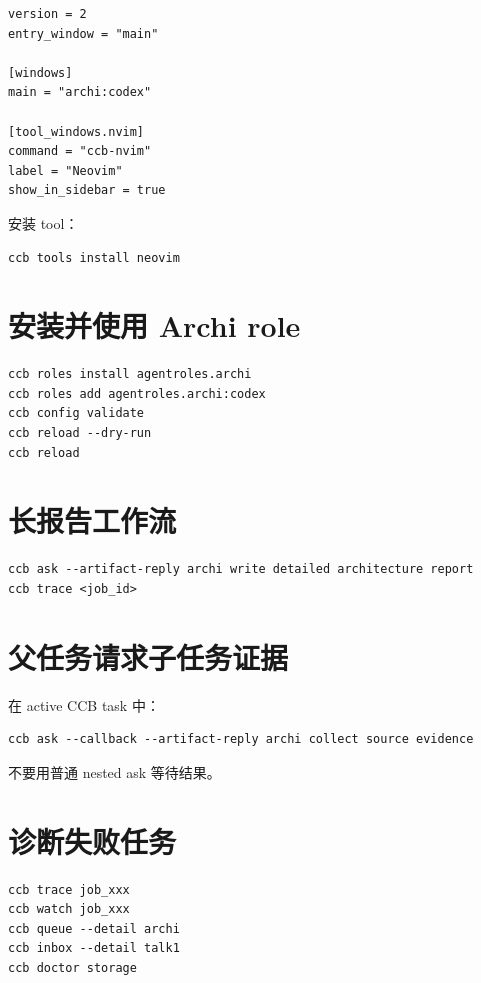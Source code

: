 \begin{lstlisting}
version = 2
entry_window = "main"

[windows]
main = "archi:codex"

[tool_windows.nvim]
command = "ccb-nvim"
label = "Neovim"
show_in_sidebar = true
\end{lstlisting}

安装 tool：

\begin{lstlisting}
ccb tools install neovim
\end{lstlisting}

\section{安装并使用 Archi role}

\begin{lstlisting}
ccb roles install agentroles.archi
ccb roles add agentroles.archi:codex
ccb config validate
ccb reload --dry-run
ccb reload
\end{lstlisting}

\section{长报告工作流}

\begin{lstlisting}
ccb ask --artifact-reply archi write detailed architecture report
ccb trace <job_id>
\end{lstlisting}

\section{父任务请求子任务证据}

在 active CCB task 中：

\begin{lstlisting}
ccb ask --callback --artifact-reply archi collect source evidence
\end{lstlisting}

不要用普通 nested ask 等待结果。

\section{诊断失败任务}

\begin{lstlisting}
ccb trace job_xxx
ccb watch job_xxx
ccb queue --detail archi
ccb inbox --detail talk1
ccb doctor storage
\end{lstlisting}


